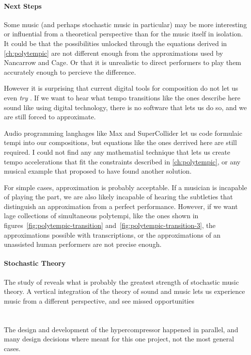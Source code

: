 \paragraph{Next Steps} Some music (and perhaps stochastic music in
particular) may be more interesting or influential from a theoretical
perspective than for the music itself in isolation. It could be that
the possibilities unlocked through the equations derived in
\autoref{ch:polytempic} are not different enough from the
approximations used by Nancarrow and Cage. Or that it is unrealistic
to direct performers to play them accurately enough to percieve the
difference.

However it is surprising that current digital tools for composition do
not let us even \emph{try} \polytempic. If we want to hear what tempo
transitions like the ones describe here sound like using digital
technology, there is no software that lets us do so, and we are still
forced to approximate. 

Audio programming langhages like Max and SuperCollider let us code
formulaic tempi into our compositions, but equations like the ones
derrived here are still required. I could not find any any mathematial
technique that lets us create tempo accelerations that fit the
constraints described in \autoref{ch:polytempic}, or any musical
example that proposed to have found another solution.

For simple cases, approximation is probably acceptable. If a musician
is incapable of playing the part, we are also likely incapable of
hearing the subtleties that distinguish an approximation from a
perfect performance. However, if we want lage collections of
simultaneous polytempi, like the ones shown in
figures~\ref{fig:polytempic-transition}
and~\ref{fig:polytempic-transition-3}, the approximations possible
with transcriptions, or the approximations of an unassisted human
performers are not precise enough.

\paragraph{Stochastic Theory} The study of \polytempic reveals what is
probably the greatest strength of stochastic music theory. A vertical
integration of the theory of sound and music lets us experience music
from a different perspective, and see missed opportunities 


\section{\thesis}
The design and development of the hypercompressor happened in
parallel, and many design decisions where meant for this one project,
not the most general cases. 

